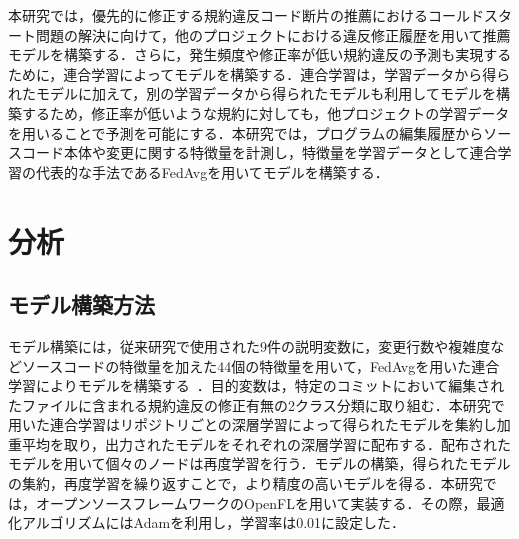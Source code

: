 \documentclass[uplatex,dvipdfmx,a4paper,twocolumn,base=11pt,jbase=11pt,ja=standard]{bxjsarticle}  %
\newcommand{\todo}[1]{\colorbox{yellow}{{\bf TODO}:}{\color{red} {\textbf{[#1]}}}}
\begin{document}
本研究では，優先的に修正する規約違反コード断片の推薦におけるコールドスタート問題の解決に向けて，他のプロジェクトにおける違反修正履歴を用いて推薦モデルを構築する．さらに，発生頻度や修正率が低い規約違反の予測も実現するために，連合学習によってモデルを構築する．連合学習は，学習データから得られたモデルに加えて，別の学習データから得られたモデルも利用してモデルを構築するため，修正率が低いような規約に対しても，他プロジェクトの学習データを用いることで予測を可能にする．本研究では，プログラムの編集履歴からソースコード本体や変更に関する特徴量を計測し，特徴量を学習データとして連合学習の代表的な手法であるFedAvgを用いてモデルを構築する．


\section{分析}

\subsection{モデル構築方法}
モデル構築には，従来研究で使用された9件の説明変数に，変更行数や複雑度などソースコードの特徴量を加えた44個の特徴量を用いて，FedAvgを用いた連合学習によりモデルを構築する~\cite{article2}．目的変数は，特定のコミットにおいて編集されたファイルに含まれる規約違反の修正有無の2クラス分類に取り組む．本研究で用いた連合学習はリポジトリごとの深層学習によって得られたモデルを集約し加重平均を取り，出力されたモデルをそれぞれの深層学習に配布する．配布されたモデルを用いて個々のノードは再度学習を行う．モデルの構築，得られたモデルの集約，再度学習を繰り返すことで，より精度の高いモデルを得る．本研究では，オープンソースフレームワークのOpenFLを用いて実装する．その際，最適化アルゴリズムにはAdamを利用し，学習率は0.01に設定した．

\end{document}
